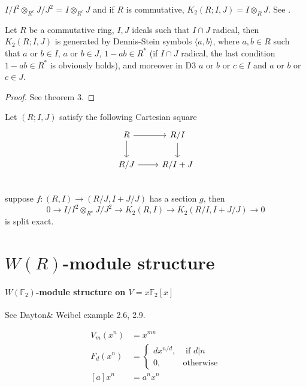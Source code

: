 \begin{remark}
   $I/I^2\otimes_{R^e}J/J^2$ = $I \otimes_{R^e} J$ and if $R$ is commutative, $K_2(R;I,J)=I\otimes_R J$. See \cite{Guin-Waléry1981}.
\end{remark}

\begin{theorem}
	Let $R$ be a commutative ring, $I,J$ ideals such that $I\cap J$ radical, then $K_2(R;I,J)$ is generated by Dennis-Stein symbols $\langle a,b \rangle$, where $a,b\in R$ such that $a$ or $b\in I$, $a$ or $b\in J$, $1-ab\in R^*$ (if $I\cap J$ radical, the last condition $1-ab\in R^*$ is obviously holds), and moreover in D3 $a$ or $b$ or $c\in I$ and $a$ or $b$ or $c\in J$.
\end{theorem}
\begin{proof}
	See \cite{Guin-Waléry1981} theorem 3.
\end{proof}
\begin{lemma}
	Let $(R;I,J)$ satisfy the following Cartesian square
		\[\begin{tikzcd}
			R \ar[r] \ar[d]& R/I\ar[d]\\
			R/J \ar[r] & R/I+J\\
		\end{tikzcd}\]
	suppose $f\colon (R,I)\longrightarrow (R/J,I+J/J)$ has a section $g$, then
	\[0 \longrightarrow I/I^2\otimes_{R^e}J/J^2\longrightarrow K_2(R,I)\longrightarrow K_2(R/I,I+J/J)\longrightarrow 0\]
	is split exact.
\end{lemma}


\section{\texorpdfstring{$W(R)$}{W(R)}-module structure} %
\label{sec:module_structure}


\paragraph{$W(\mathbb{F}_2)$-module structure on $V=x \mathbb{F}_2[x]$} See Dayton\& Weibel \cite{MR96j:16008} example 2.6, 2.9.

\begin{align*}
 V_m(x^n)&=x^{mn}\\
 F_d(x^n)&=\begin{cases}
 	dx^{n/d},& \mbox{ if $d|n$}\\
 	0,& \mbox{otherwise}
 \end{cases}\\
 [a]x^n&=a^nx^n
 \end{align*}
